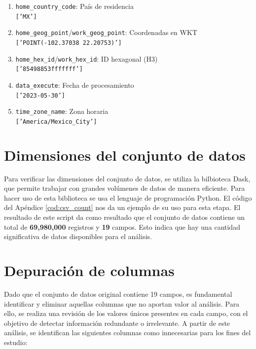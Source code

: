 \begin{enumerate}[leftmargin=*, align=left, noitemsep]
    \item \texttt{home\_country\_code}: País de residencia \\ 
    \footnotesize{\texttt{['MX']}}
    \normalsize

    \item \texttt{home\_geog\_point}/\texttt{work\_geog\_point}: Coordenadas en WKT \\ 
    \footnotesize{\texttt{['POINT(-102.37038 22.20753)']}}
    \normalsize

    \item \texttt{home\_hex\_id}/\texttt{work\_hex\_id}: ID hexagonal (H3) \\ 
    \footnotesize{\texttt{['85498853fffffff']}}
    \normalsize

    \item \texttt{data\_execute}: Fecha de procesamiento \\ 
    \footnotesize{\texttt{['2023-05-30']}}
    \normalsize

    \item \texttt{time\_zone\_name}: Zona horaria \\ 
    \footnotesize{\texttt{['America/Mexico\_City']}}
    \normalsize
\end{enumerate}
\vfill

\section{Dimensiones del conjunto de datos}
\label{sec:dimensiones}
Para verificar las dimensiones del conjunto de datos, se utiliza la bilbioteca Dask, que permite trabajar con grandes volúmenes de datos de manera eficiente. Para hacer uso de esta biblioteca se usa el lenguaje de programación Python. El código del Apéndice \ref{cod:csv_count} nos da un ejemplo de su uso para esta etapa. El resultado de este script da como resultado que el conjunto de datos contiene un total de \textbf{69,980,000} registros y \textbf{19} campos. Esto indica que hay una cantidad significativa de datos disponibles para el análisis.

\section{Depuración de columnas}
\label{sec:depuracion_columnas}
Dado que el conjunto de datos original contiene 19 campos, es fundamental identificar y eliminar aquellas columnas que no aportan valor al análisis. Para ello, se realiza una revisión de los valores únicos presentes en cada campo, con el objetivo de detectar información redundante o irrelevante. A partir de este análisis, se identifican las siguientes columnas como innecesarias para los fines del estudio:

